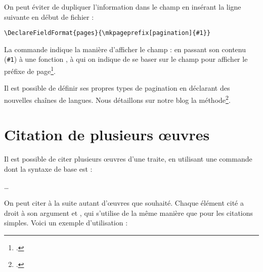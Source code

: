 \begin{quotation}
\cite[2]{desnos}

\cite{desnos}
\end{quotation}


\begin{plusloins}
On peut éviter de dupliquer l'information dans le champ  en insérant la ligne suivante en début de fichier  :

\begin{verbatim}
\DeclareFieldFormat{pages}{\mkpageprefix[pagination]{#1}}
\end{verbatim}

La commande  indique la manière d'afficher le champ  : en passant son contenu (\verb|#1|) à une fonction , à qui on indique de se baser sur le champ  pour afficher le préfixe de page\footcite[Voir][]{biblatex_formating}.
\end{plusloins}

\begin{plusloins}
Il est possible de définir ses propres types de pagination en déclarant des nouvelles chaînes de langues. Nous détaillons sur notre blog la méthode\footcite{biblio_pagination}.
\end{plusloins}



\section{Citation de plusieurs œuvres}\label{citemultiple}

Il est possible de citer plusieurs œuvres d'une traite, en  utilisant une commande dont la syntaxe de base est :

…

On peut  citer à la suite autant d'œuvres que souhaité. Chaque élément cité a droit à son argument  et , qui s'utilise de la même manière que pour les citations simples.
Voici un exemple d'utilisation : 

\begin{latexcode}
\autocites{Saxer1980}{Junod1992}
\end{latexcode}

\begin{quotation}
\cites{Saxer1980}{Junod1992}
\end{quotation}

